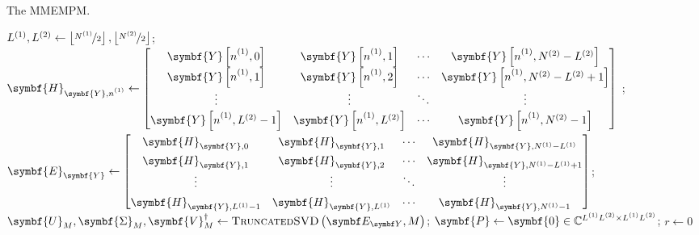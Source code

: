 {\begin{algorithm}
    \caption{
        The \acl{MMEMPM}.
    }
    \label{alg:mmempm}
    \begin{algorithmic}[1]
        \State $L^{(1)}, L^{(2)} \gets \left\lfloor \nicefrac{N^{(1)}}{2} \right\rfloor, \left\lfloor \nicefrac{N^{(2)}}{2} \right\rfloor$;
            \State  $\symbf{H}_{\symbf{Y},\none} \gets
                \def\arraystretch{1.4}
            \begin{bmatrix}
                \symbf{Y}\left[\none, 0\right] &
                \symbf{Y}\left[\none, 1\right] &
                \cdots &
                \symbf{Y}\left[\none, \Ntwo-L^{(2)}\right]\\
                \symbf{Y}\left[\none, 1\right] &
                \symbf{Y}\left[\none, 2\right] &
                \cdots &
                \symbf{Y}\left[\none, \Ntwo-L^{(2)}+1\right]\\
                \vdots & \vdots & \ddots & \vdots\\
                \symbf{Y}\left[\none, L^{(2)} - 1\right] &
                \symbf{Y}\left[\none, L^{(2)}\right] &
                \cdots &
                \symbf{Y}\left[\none, \Ntwo-1\right]\\
            \end{bmatrix}
        $
        \EndFor;
        \State $\symbf{E}_{\symbf{Y}} \gets
        \begin{bmatrix}
            \symbf{H}_{\symbf{Y},0} & \symbf{H}_{\symbf{Y},1} & \cdots & \symbf{H}_{\symbf{Y},\None - L^{(1)}}\\
            \symbf{H}_{\symbf{Y},1} & \symbf{H}_{\symbf{Y},2} & \cdots & \symbf{H}_{\symbf{Y},\None - L^{(1)} + 1}\\
            \vdots & \vdots & \ddots & \vdots\\
            \symbf{H}_{\symbf{Y},L^{(1)} - 1} & \symbf{H}_{\symbf{Y},L^{(1)}} & \cdots & \symbf{H}_{\symbf{Y},\None - 1}
        \end{bmatrix}
        $;
        \State $\symbf{U}_M^{\vphantom{\dagger}},
            \symbf{\Sigma}_M^{\vphantom{\dagger}},
            \symbf{V}_M^{\dagger} \gets
            \textsc{TruncatedSVD}\left(\EY, M\right)$;
        \State $\symbf{P} \gets \symbf{0} \in \mathbb{C}^{\Lone \Ltwo \times \Lone \Ltwo}$;
        \State $r \gets 0$

\end{algorithmic}
\end{algorithm}}
